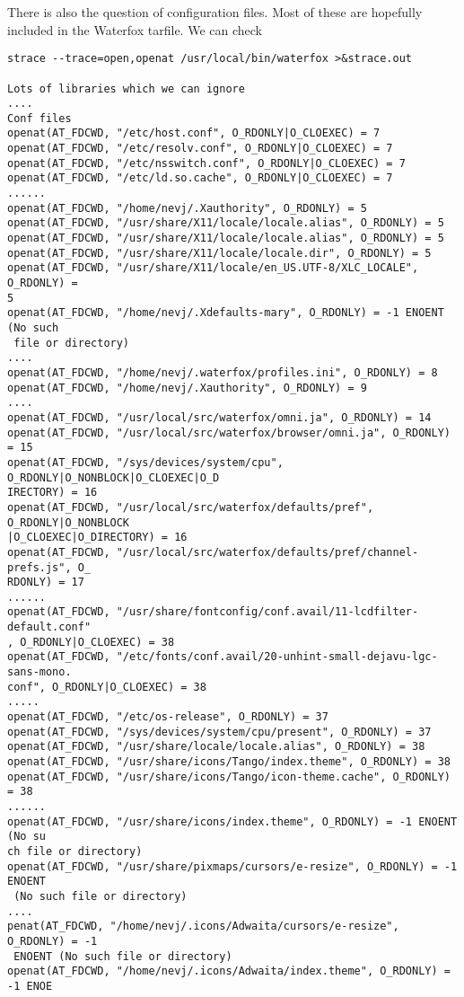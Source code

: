 \documentclass[a4paper]{article}  %
\begin{document}
There is also the question of configuration files. Most of these are hopefully included in the Waterfox tarfile. We can check
\begin{tcolorbox}[breakable]
\begin{verbatim}
strace --trace=open,openat /usr/local/bin/waterfox >&strace.out

Lots of libraries which we can ignore
....
Conf files
openat(AT_FDCWD, "/etc/host.conf", O_RDONLY|O_CLOEXEC) = 7
openat(AT_FDCWD, "/etc/resolv.conf", O_RDONLY|O_CLOEXEC) = 7
openat(AT_FDCWD, "/etc/nsswitch.conf", O_RDONLY|O_CLOEXEC) = 7
openat(AT_FDCWD, "/etc/ld.so.cache", O_RDONLY|O_CLOEXEC) = 7
......
openat(AT_FDCWD, "/home/nevj/.Xauthority", O_RDONLY) = 5
openat(AT_FDCWD, "/usr/share/X11/locale/locale.alias", O_RDONLY) = 5
openat(AT_FDCWD, "/usr/share/X11/locale/locale.alias", O_RDONLY) = 5
openat(AT_FDCWD, "/usr/share/X11/locale/locale.dir", O_RDONLY) = 5
openat(AT_FDCWD, "/usr/share/X11/locale/en_US.UTF-8/XLC_LOCALE", O_RDONLY) = 
5
openat(AT_FDCWD, "/home/nevj/.Xdefaults-mary", O_RDONLY) = -1 ENOENT (No such
 file or directory)
....
openat(AT_FDCWD, "/home/nevj/.waterfox/profiles.ini", O_RDONLY) = 8
openat(AT_FDCWD, "/home/nevj/.Xauthority", O_RDONLY) = 9
....
openat(AT_FDCWD, "/usr/local/src/waterfox/omni.ja", O_RDONLY) = 14
openat(AT_FDCWD, "/usr/local/src/waterfox/browser/omni.ja", O_RDONLY) = 15
openat(AT_FDCWD, "/sys/devices/system/cpu", O_RDONLY|O_NONBLOCK|O_CLOEXEC|O_D
IRECTORY) = 16
openat(AT_FDCWD, "/usr/local/src/waterfox/defaults/pref", O_RDONLY|O_NONBLOCK
|O_CLOEXEC|O_DIRECTORY) = 16
openat(AT_FDCWD, "/usr/local/src/waterfox/defaults/pref/channel-prefs.js", O_
RDONLY) = 17
......
openat(AT_FDCWD, "/usr/share/fontconfig/conf.avail/11-lcdfilter-default.conf"
, O_RDONLY|O_CLOEXEC) = 38
openat(AT_FDCWD, "/etc/fonts/conf.avail/20-unhint-small-dejavu-lgc-sans-mono.
conf", O_RDONLY|O_CLOEXEC) = 38
.....
openat(AT_FDCWD, "/etc/os-release", O_RDONLY) = 37
openat(AT_FDCWD, "/sys/devices/system/cpu/present", O_RDONLY) = 37
openat(AT_FDCWD, "/usr/share/locale/locale.alias", O_RDONLY) = 38
openat(AT_FDCWD, "/usr/share/icons/Tango/index.theme", O_RDONLY) = 38
openat(AT_FDCWD, "/usr/share/icons/Tango/icon-theme.cache", O_RDONLY) = 38
......
openat(AT_FDCWD, "/usr/share/icons/index.theme", O_RDONLY) = -1 ENOENT (No su
ch file or directory)
openat(AT_FDCWD, "/usr/share/pixmaps/cursors/e-resize", O_RDONLY) = -1 ENOENT
 (No such file or directory)
....
penat(AT_FDCWD, "/home/nevj/.icons/Adwaita/cursors/e-resize", O_RDONLY) = -1
 ENOENT (No such file or directory)
openat(AT_FDCWD, "/home/nevj/.icons/Adwaita/index.theme", O_RDONLY) = -1 ENOE

\end{verbatim}
\end{tcolorbox}
\end{document}

